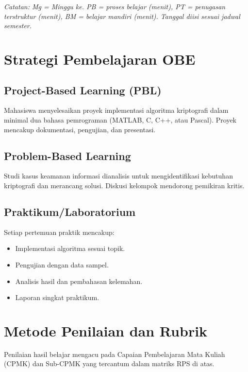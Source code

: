 \documentclass[12pt,a4paper]{article}
\begin{document}
\textit{Catatan: Mg = Minggu ke. PB = proses belajar (menit), PT = penugasan terstruktur (menit), BM = belajar mandiri (menit). Tanggal diisi sesuai jadwal semester.}

\section{Strategi Pembelajaran OBE}

\subsection{Project-Based Learning (PBL)}
Mahasiswa menyelesaikan proyek implementasi algoritma kriptografi dalam minimal dua bahasa pemrograman (MATLAB, C, C++, atau Pascal). Proyek mencakup dokumentasi, pengujian, dan presentasi.

\subsection{Problem-Based Learning}
Studi kasus keamanan informasi dianalisis untuk mengidentifikasi kebutuhan kriptografi dan merancang solusi. Diskusi kelompok mendorong pemikiran kritis.

\subsection{Praktikum/Laboratorium}
Setiap pertemuan praktik mencakup:
\begin{itemize}
\item Implementasi algoritma sesuai topik.
\item Pengujian dengan data sampel.
\item Analisis hasil dan pembahasan kelemahan.
\item Laporan singkat praktikum.
\end{itemize}

\section{Metode Penilaian dan Rubrik}

Penilaian hasil belajar mengacu pada Capaian Pembelajaran Mata Kuliah (CPMK) dan Sub-CPMK yang tercantum dalam matriks RPS di atas.
\end{document}
